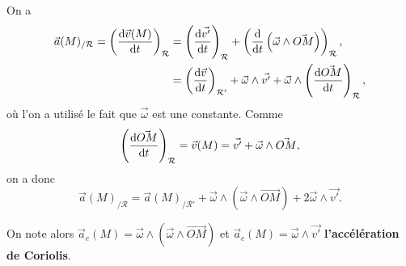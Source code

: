             On a 
            \begin{align}
                \vec{a}(M)_{/\mathcal{R}}=\left(\frac{\mathrm{d}\vec{v}(M)}{\mathrm{d} t}\right)_{\mathcal{R}}
                &=\left(\frac{\mathrm{d}\vec{v'}}{\mathrm{d} t}\right)_{\mathcal{R}}+\left(\frac{\mathrm{d}}{\mathrm{d} t}\left(\vec{\omega}\wedge\vec{OM}\right)\right)_{\mathcal{R}},\\
                &=\left(\frac{\mathrm{d}\vec{v}}{\mathrm{d} t}\right)_{\mathcal{R}'}+\vec{\omega}\wedge\vec{v'}+\vec{\omega}\wedge\left(\frac{\mathrm{d}\vec{OM}}{\mathrm{d} t}\right)_{\mathcal{R}},
            \end{align}
            où l'on a utilisé le fait que $\vec{\omega}$ est une constante. Comme 
            \begin{equation}
                \left(\dfrac{\mathrm{d}\vec{OM}}{\mathrm{d} t}\right)_{\mathcal{R}}=\vec{v}(M)=\vec{v'}+\vec{\omega}\wedge\vec{OM},
            \end{equation}
            on a donc 
            \begin{equation}
                \boxed{
                    \vec{a}(M)_{/\mathcal{R}}=\vec{a}(M)_{/\mathcal{R}'}+\vec{\omega}\wedge\left(\vec{\omega}\wedge\vec{OM}\right)+2\vec{\omega}\wedge\vec{v'}.
                }
            \end{equation}

            On note alors $\vec{a}_e(M)=\vec{\omega}\wedge\left(\vec{\omega}\wedge\vec{OM}\right)$ et $\vec{a}_c(M)=\vec{\omega}\wedge\vec{v'}$ \textbf{l'accélération de Coriolis}.

